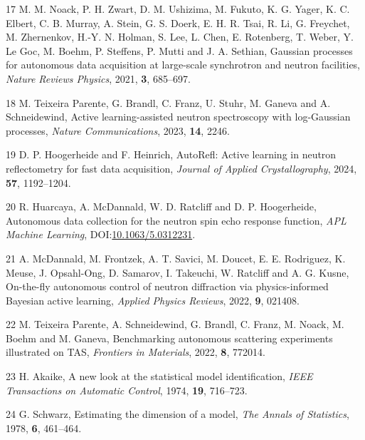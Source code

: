 \documentclass[
]{article}
\newenvironment{cslreferences}%
  {}%
  {\par}
\begin{document}
\begin{cslreferences}
\leavevmode\hypertarget{ref-noack2021}{}%
17 M. M. Noack, P. H. Zwart, D. M. Ushizima, M. Fukuto, K. G. Yager, K.
C. Elbert, C. B. Murray, A. Stein, G. S. Doerk, E. H. R. Tsai, R. Li, G.
Freychet, M. Zhernenkov, H.-Y. N. Holman, S. Lee, L. Chen, E. Rotenberg,
T. Weber, Y. Le Goc, M. Boehm, P. Steffens, P. Mutti and J. A. Sethian,
Gaussian processes for autonomous data acquisition at large-scale
synchrotron and neutron facilities, \emph{Nature Reviews Physics}, 2021,
\textbf{3}, 685--697.

\leavevmode\hypertarget{ref-teixeiraparente2023natcomms}{}%
18 M. Teixeira Parente, G. Brandl, C. Franz, U. Stuhr, M. Ganeva and A.
Schneidewind, Active learning-assisted neutron spectroscopy with
log-Gaussian processes, \emph{Nature Communications}, 2023, \textbf{14},
2246.

\leavevmode\hypertarget{ref-hoogerheide2024autorefl}{}%
19 D. P. Hoogerheide and F. Heinrich, AutoRefl: Active learning in
neutron reflectometry for fast data acquisition, \emph{Journal of
Applied Crystallography}, 2024, \textbf{57}, 1192--1204.

\leavevmode\hypertarget{ref-huarcaya2026autonse}{}%
20 R. Huarcaya, A. McDannald, W. D. Ratcliff and D. P. Hoogerheide,
Autonomous data collection for the neutron spin echo response function,
\emph{APL Machine Learning},
DOI:\href{https://doi.org/10.1063/5.0312231}{10.1063/5.0312231}.

\leavevmode\hypertarget{ref-mcdannald2022andie}{}%
21 A. McDannald, M. Frontzek, A. T. Savici, M. Doucet, E. E. Rodriguez,
K. Meuse, J. Opsahl-Ong, D. Samarov, I. Takeuchi, W. Ratcliff and A. G.
Kusne, On-the-fly autonomous control of neutron diffraction via
physics-informed Bayesian active learning, \emph{Applied Physics
Reviews}, 2022, \textbf{9}, 021408.

\leavevmode\hypertarget{ref-teixeiraparente2022front}{}%
22 M. Teixeira Parente, A. Schneidewind, G. Brandl, C. Franz, M. Noack,
M. Boehm and M. Ganeva, Benchmarking autonomous scattering experiments
illustrated on TAS, \emph{Frontiers in Materials}, 2022, \textbf{8},
772014.

\leavevmode\hypertarget{ref-akaike1974}{}%
23 H. Akaike, A new look at the statistical model identification,
\emph{IEEE Transactions on Automatic Control}, 1974, \textbf{19},
716--723.

\leavevmode\hypertarget{ref-schwarz1978}{}%
24 G. Schwarz, Estimating the dimension of a model, \emph{The Annals of
Statistics}, 1978, \textbf{6}, 461--464.


\end{cslreferences}
\end{document}
